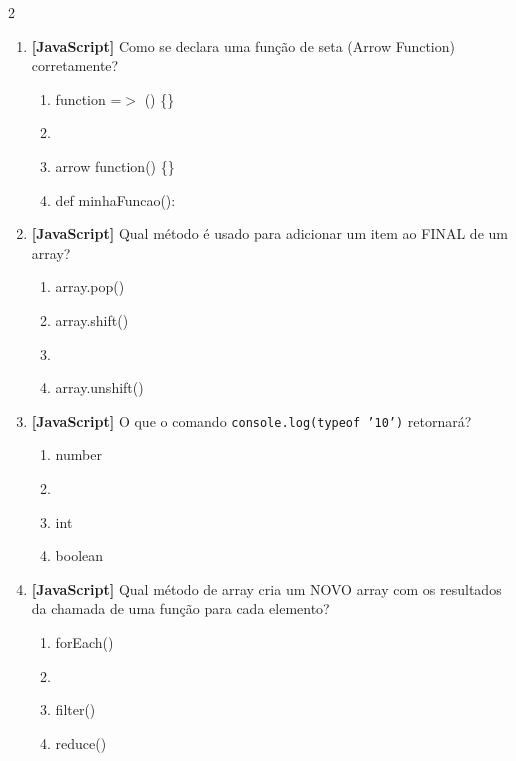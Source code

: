 \documentclass[a4paper,10pt]{article}
\begin{document}
\begin{multicols*}{2}
\begin{enumerate}[label=\textbf{\arabic*.}, resume, leftmargin=*]
\item \textbf{[JavaScript]} Como se declara uma função de seta (Arrow Function) corretamente?
\begin{enumerate}[label=(\alph*), noitemsep]
  \item function =$>$ () \{\}
  \item {}
  \item arrow function() \{\}
  \item def minhaFuncao():
\end{enumerate}

\item \textbf{[JavaScript]} Qual método é usado para adicionar um item ao FINAL de um array?
\begin{enumerate}[label=(\alph*), noitemsep]
  \item array.pop()
  \item array.shift()
  \item {}
  \item array.unshift()
\end{enumerate}

\item \textbf{[JavaScript]} O que o comando \texttt{console.log(typeof '10')} retornará?
\begin{enumerate}[label=(\alph*), noitemsep]
  \item number
  \item {}
  \item int
  \item boolean
\end{enumerate}

\item \textbf{[JavaScript]} Qual método de array cria um NOVO array com os resultados da chamada de uma função para cada elemento?
\begin{enumerate}[label=(\alph*), noitemsep]
  \item forEach()
  \item {}
  \item filter()
  \item reduce()
\end{enumerate}

\end{enumerate}
\end{multicols*}
\newpage
\end{document}
